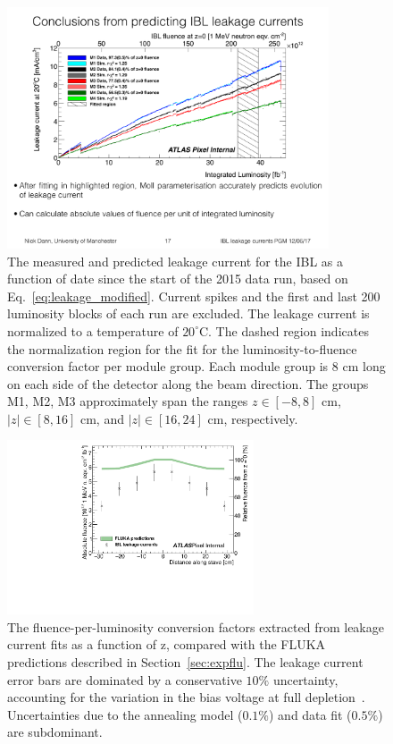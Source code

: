 \begin{figure}[!htpb]
\centering
\includegraphics[width=0.85\textwidth]{leakagecurrent_Dann.pdf}
\caption{The measured and predicted leakage current for the IBL as a function of date since the start of the 2015 data run, based on Eq.~\ref{eq:leakage_modified}.   Current spikes and the first and last 200 luminosity blocks of each run are excluded. The leakage current is normalized to a temperature of $20^{\circ}$C. The dashed region indicates the normalization region for the fit for the luminosity-to-fluence conversion factor per module group. Each module group is $8$ cm long on each side of the detector along the beam direction.  The groups M1, M2, M3 approximately span the ranges $z\in[-8,8]$ cm, $|z|\in[8,16]$ cm, and $|z|\in [16,24]$ cm, respectively. }
\label{fig:leackagecurrent:beta}
\end{figure}

\begin{figure}[!htpb]
\centering
\includegraphics[width=0.65\textwidth]{simulation-FLUKA-absolute.pdf}
\caption{The fluence-per-luminosity conversion factors extracted from leakage current fits as a function of z, compared with the FLUKA predictions described in Section~\ref{sec:expflu}. The leakage current error bars are dominated by a conservative $10\%$ uncertainty, accounting for the variation in the bias voltage at full depletion~\cite{ATL-INDET-PUB-2014-006}.  Uncertainties due to the annealing model ($0.1\%$) and data fit ($0.5\%$) are subdominant.}
\label{fig:leackagecurrent:eta}
\end{figure}

